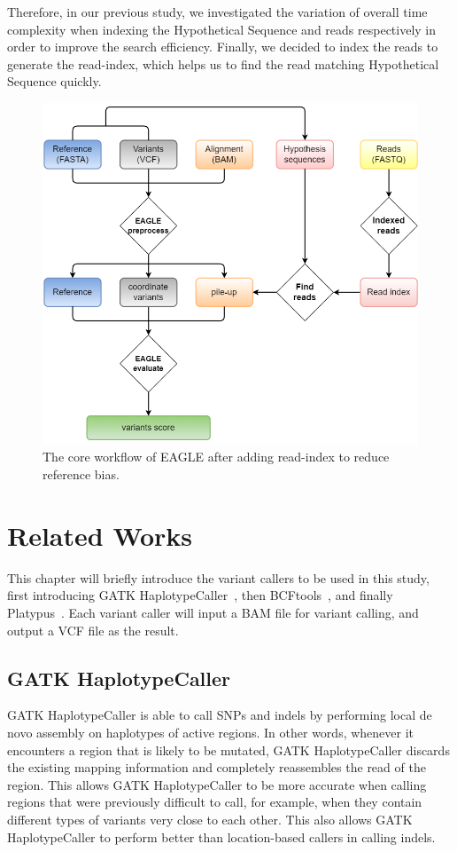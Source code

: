 \documentclass[PhD]{PHlab-thesis}
\begin{document}
Therefore, in our previous study, we investigated the variation of overall time complexity when indexing the Hypothetical Sequence and reads respectively in order to improve the search efficiency. Finally, we decided to index the reads to generate the read-index, which helps us to find the read matching Hypothetical Sequence quickly.
\\
\begin{figure}[h!]
	\centering
	\includegraphics[scale=0.7]{figures/EAGLE after.png}
	\caption{The core workflow of EAGLE after adding read-index to reduce reference bias.}
	\label{fig:EAGLE with read-index} %
\end{figure}

\chapter{Related Works}
This chapter will briefly introduce the variant callers to be used in this study, first introducing GATK HaplotypeCaller~\cite{Poplin2018GH}, then BCFtools~\cite{Danecek2021BCFtools}, and finally Platypus~\cite{Rimmer2014Platypus}. Each variant caller will input a BAM file for variant calling, and output a VCF file as the result.
\section{GATK HaplotypeCaller}
GATK HaplotypeCaller is able to call SNPs and indels by performing local de novo assembly on haplotypes of active regions. In other words, whenever it encounters a region that is likely to be mutated, GATK HaplotypeCaller discards the existing mapping information and completely reassembles the read of the region. This allows GATK HaplotypeCaller to be more accurate when calling regions that were previously difficult to call, for example, when they contain different types of variants very close to each other. This also allows GATK HaplotypeCaller to perform better than location-based callers in calling indels.
\end{document}

